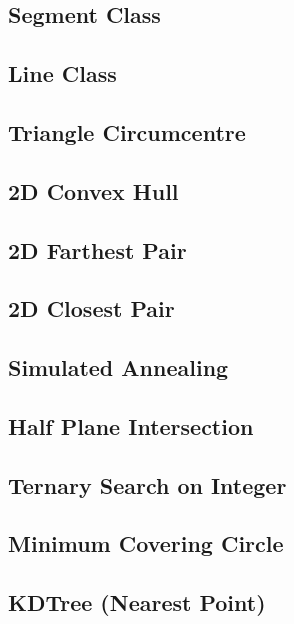 \documentclass[a4paper,10pt,twocolumn,oneside]{article}
\begin{document}
\subsection{Segment Class}

\subsection{Line Class}

\subsection{Triangle Circumcentre}

\subsection{2D Convex Hull}

\subsection{2D Farthest Pair}

\subsection{2D Closest Pair}

\subsection{Simulated Annealing}

\subsection{Half Plane Intersection}

\subsection{Ternary Search on Integer}

\subsection{Minimum Covering Circle}

\subsection{KDTree (Nearest Point)}

\end{document}

